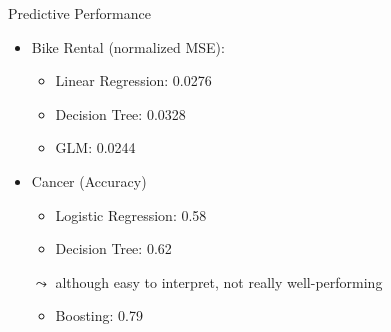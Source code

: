 \documentclass[aspectratio=169]{../latex_main/tntbeamer}  %
\begin{document}
	\begin{frame}{Predictive Performance}
        
        \begin{itemize}
            \item Bike Rental (normalized MSE):
            \begin{itemize}
                \item Linear Regression: 0.0276
                \item Decision Tree: 0.0328
                \item GLM: 0.0244
            \end{itemize}
            \pause
            \medskip
            \item Cancer (Accuracy)
            \begin{itemize}
                \item Logistic Regression: 0.58
                \item Decision Tree: 0.62
            \end{itemize}
            \pause
            \smallskip
            \item[$\leadsto$] although easy to interpret, not really well-performing 
            \begin{itemize}
                \item Boosting: 0.79
            \end{itemize}
        \end{itemize}
        
    \end{frame}
	
\end{document}
